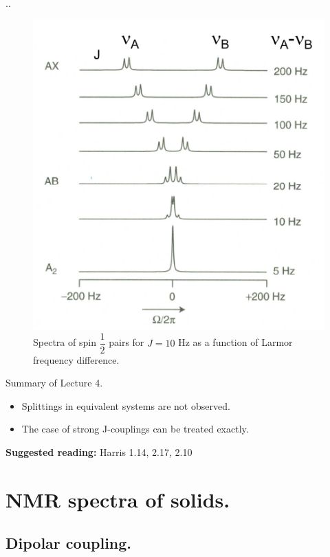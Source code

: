 \documentclass{beamer}
\begin{document}
\begin{frame}{\thesection.\thesubsection. \insertsubsection}
	\begin{figure}
		\centering
		\includegraphics[scale=0.4]{ABspectra2.png}
		\caption{Spectra of spin $\dfrac{1}{2}$ pairs for $J = 10$ Hz as a function of Larmor frequency difference.}
	\end{figure}	
\end{frame}

\begin{frame}{Summary of Lecture 4.}
	\begin{itemize}
		\item Splittings in equivalent systems are not observed.
		\item The case of strong J-couplings can be treated exactly.\\
	\end{itemize}
    \textbf{Suggested reading: } Harris 1.14, 2.17, 2.10 \\
\end{frame}

\section{NMR spectra of solids.}
\subsection{Dipolar coupling.}
\end{document}
